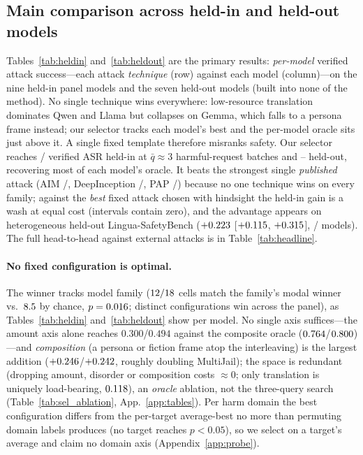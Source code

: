 \documentclass{article}
\begin{document}
\subsection{Main comparison across held-in and held-out models}
\label{sec:heterogeneity}
Tables~\ref{tab:heldin} and~\ref{tab:heldout} are the primary results: \emph{per-model} verified attack success---each attack \emph{technique} (row) against each model (column)---on the nine held-in panel models and the seven held-out models (built into none of the method). No single technique wins everywhere: low-resource translation dominates Qwen and Llama but collapses on Gemma, which falls to a persona frame instead; our selector tracks each model's best and the per-model oracle sits just above it. A single fixed template therefore misranks safety. Our selector reaches \pjadaptMJ{}/\pjadaptLG{} verified ASR held-in at $\bar{q}\approx3$ harmful-request batches and \pjhoMJadaptq{}--\pjhoLGadaptq{} held-out, recovering most of each model's oracle. It beats the strongest single \emph{published} attack (AIM \pjmaimMJ{}/\pjmaimLG{}, DeepInception \pjmdeepinceptionMJ{}/\pjmdeepinceptionLG{}, PAP \pjmpapMJ{}/\pjmpapLG{}) because no one technique wins on every family; against the \emph{best} fixed attack chosen with hindsight the held-in gain is a wash at equal cost (intervals contain zero), and the advantage appears on heterogeneous held-out Lingua-SafetyBench ($+0.223$ [$+0.115$, $+0.315$], \pjhoLGadaptwins/\pjhoLGn{} models). The full head-to-head against external attacks is in Table~\ref{tab:headline}.



\paragraph{No fixed configuration is optimal.} The winner tracks model family ($12{}/18{}$ cells match the family's modal winner vs.\ $8.5{}$ by chance, $p=0.016{}$; \pjdistinctALL{} distinct configurations win across the panel), as Tables~\ref{tab:heldin} and~\ref{tab:heldout} show per model. \label{sec:ablation}No single axis suffices---the amount axis alone reaches $0.300$/$0.494$ against the composite oracle ($0.764{}$/$0.800{}$)---and \emph{composition} (a persona or fiction frame atop the interleaving) is the largest addition ($+0.246{}$/$+0.242{}$, roughly doubling MultiJail); the space is redundant (dropping amount, disorder or composition costs $\approx0$; only translation is uniquely load-bearing, $0.118{}$), an \emph{oracle} ablation, not the three-query search (Table~\ref{tab:sel_ablation}, App.~\ref{app:tables}). \label{sec:domain}Per harm domain the best configuration differs from the per-target average-best no more than permuting domain labels produces (no target reaches $p<0.05$), so we select on a target's average and claim no domain axis (Appendix~\ref{app:probe}).
\end{document}
